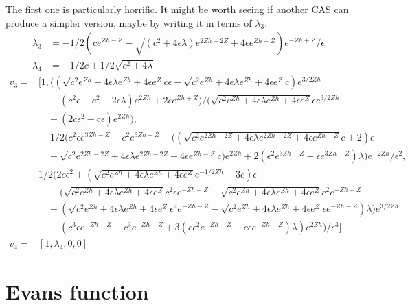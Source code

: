 \documentclass[10pt]{article}
\begin{document}
The first one is particularly horrific.
It might be worth seeing if another CAS can produce a simpler version, maybe by writing it in terms of $\lambda_3$.
\begin{align*}
    \lambda_3 &=-1/2 \left(c e^{Z h - Z} - \sqrt{(c^2 + 4 \epsilon \lambda) e^{2 Z h - 2 Z} +
4 \epsilon e^{Z h - Z}}\right) e^{-Z h + Z}/\epsilon
\\
    \lambda_4 &= -1/2 c + 1/2 \sqrt{c^2 + 4 \lambda}
\end{align*}
\begin{align*}
    v_3 =& [1, ((\sqrt{c^2 e^{Z h} +
4 \epsilon \lambda e^{Z h} + 4 \epsilon e^Z} c \epsilon - \sqrt{c^2 e^{Z h} +
4 \epsilon \lambda e^{Z h} + 4 \epsilon e^Z} c) e^{3/2 Z h} \\
& \quad - (c^2 \epsilon - c^2 -
2 \epsilon \lambda) e^{2 Z h} + 2 \epsilon e^{Z h + Z})/(\sqrt{c^2 e^{Z h} +
4 \epsilon \lambda e^{Z h} + 4 \epsilon e^Z} \epsilon e^{3/2 Z h} \\
& \quad + (2 c \epsilon^2 -
    c \epsilon) e^{2 Z h}), \\
    &\!-1/2 (c^2 \epsilon e^{3 Z h - Z} - c^2 e^{3 Z h - Z} -
    ((\sqrt{c^2 e^{2 Z h - 2 Z} + 4 \epsilon \lambda e^{2 Z h - 2 Z} + 4 \epsilon e^{Z h
    - Z}} c + 2) \epsilon \\
    & \quad - \sqrt{c^2 e^{2 Z h - 2 Z} + 4 \epsilon \lambda e^{2 Z h -
    2 Z} + 4 \epsilon e^{Z h - Z}} c) e^{2 Z h} + 2 (\epsilon^2 e^{3 Z h - Z} -
    \epsilon e^{3 Z h - Z}) \lambda) e^{-2 Z h}/\epsilon^2, \\
    & 1/2 (2 c \epsilon^2 +
    (\sqrt{c^2 e^{Z h} + 4 \epsilon \lambda e^{Z h} + 4 \epsilon e^Z} e^{-1/2 Z h} -
    3 c) \epsilon \\
    & \quad - (\sqrt{c^2 e^{Z h} + 4 \epsilon \lambda e^{Z h} +
    4 \epsilon e^Z} c^2 \epsilon e^{-Z h - Z} - \sqrt{c^2 e^{Z h} + 4 \epsilon \lambda e^{Z h}
    + 4 \epsilon e^Z} c^2 e^{-Z h - Z} \\ 
    & \quad + (\sqrt{c^2 e^{Z h} + 4 \epsilon \lambda e^{Z h}
    + 4 \epsilon e^Z} \epsilon^2 e^{-Z h - Z} - \sqrt{c^2 e^{Z h} + 4 \epsilon \lambda e^{Z h}
    + 4 \epsilon e^Z} \epsilon e^{-Z h - Z}) \lambda) e^{3/2 Z h} \\
    & \quad + (c^3 \epsilon e^{-Z h -
    Z} - c^3 e^{-Z h - Z} + 3 (c \epsilon^2 e^{-Z h - Z} - c \epsilon e^{-Z h -
Z}) \lambda) e^{2 Z h})/\epsilon^3]
\\
v_4 =& [1, \lambda_4, 0, 0]
\end{align*}

\section{Evans function}
\end{document}
